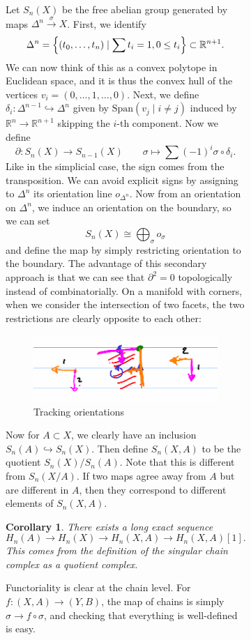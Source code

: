 \documentclass[leqno, openany]{memoir}
\newtheorem{cor}[thm]{Corollary}
\theoremstyle{definition}
\theoremstyle{remark}
\theoremstyle{plain}
\theoremstyle{definition}
\theoremstyle{remark}
\newcommand{\R}{\mathbb{R}}
\newcommand{\mr}[1]{\mathrm{#1}}
\begin{document}
\begin{figure}[H]
\begin{figure}[H]
Let $S_n(X)$ be the free abelian group generated by maps $\Delta^n
\xrightarrow{\sigma} X$. First, we identify \[ \Delta^n = \qty{(t_0, \ldots,
t_n) \mid \sum t_i = 1, 0 \leq t_i } \subset \R^{n+1}. \] We can now think of
this as a convex polytope in Euclidean space, and it is thus the convex hull of
the vertices $v_i = (0, \ldots, 1, \ldots, 0)$. Next, we define $\delta_i
\colon \Delta^{n-1} \hookrightarrow \Delta^n$ given by $\mr{Span}(v_j \mid i
\neq j)$ induced by $\R^{n} \to \R^{n+1}$ skipping the $i$-th component. Now we
define \[ \partial \colon S_n(X) \to S_{n-1}(X) \qquad \sigma \mapsto \sum
(-1)^i \sigma \circ \delta_i. \] Like in the simplicial case, the sign comes
from the transposition. We can avoid explicit signs by assigning to $\Delta^n$
its orientation line $o_{\Delta^n}$. Now from an orientation on $\Delta^n$, we
induce an orientation on the boundary, so we can set \[ S_n(X) \cong
\bigoplus_{\sigma} o_{\sigma} \] and define the map by simply restricting
orientation to the boundary. The advantage of this secondary approach is that
we can see that $\partial^2 = 0$ topologically instead of combinatorially. On a
manifold with corners, when we consider the intersection of two facets, the two
restrictions are clearly opposite to each other: \begin{figure}[H] \centering
    \includegraphics[scale=1]{orientsimp.png} \caption{Tracking orientations}%
\label{fig:orientsimp} \end{figure}

Now for $A \subset X$, we clearly have an inclusion $S_n(A) \hookrightarrow
S_n(X)$. Then define $S_n(X,A)$ to be the quotient $S_n(X) / S_n(A)$. Note that
this is different from $S_n(X/A)$. If two maps agree away from $A$ but are
different in $A$, then they correspond to different elements of $S_n(X,A)$.

\begin{cor} There exists a long exact sequence \[ H_n(A) \to H_n(X) \to
H_n(X,A) \to H_n(X,A)[1]. \] This comes from the definition of the singular
chain complex as a quotient complex.  \end{cor}

Functoriality is clear at the chain level. For $f \colon (X,A) \to (Y,B)$, the
map of chains is simply $\sigma \to f \circ \sigma$, and checking that
everything is well-defined is easy.


\end{figure}
\end{figure}
\end{document}

